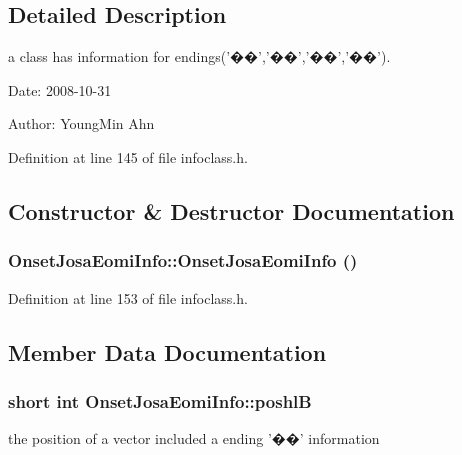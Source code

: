 \subsection{Detailed Description}
a class has information for endings('��','��','��','��'). 

\begin{Desc}
\item[Date:]2008-10-31 \end{Desc}
\begin{Desc}
\item[Author:]YoungMin Ahn \end{Desc}


Definition at line 145 of file infoclass.h.

\subsection{Constructor \& Destructor Documentation}
\hypertarget{classOnsetJosaEomiInfo_2fd1f43b8d58e4d59fb61e9d871b03b2}{
\subsubsection[{OnsetJosaEomiInfo}]{\setlength{\rightskip}{0pt plus 5cm}OnsetJosaEomiInfo::OnsetJosaEomiInfo ()}}
\label{classOnsetJosaEomiInfo_2fd1f43b8d58e4d59fb61e9d871b03b2}




Definition at line 153 of file infoclass.h.

\subsection{Member Data Documentation}
\hypertarget{classOnsetJosaEomiInfo_cab2eca3ece4492cc5ddbca7e1a68267}{
\subsubsection[{poshlB}]{\setlength{\rightskip}{0pt plus 5cm}short int {\bf OnsetJosaEomiInfo::poshlB}}}
\label{classOnsetJosaEomiInfo_cab2eca3ece4492cc5ddbca7e1a68267}


the position of a vector included a ending '��' information 



